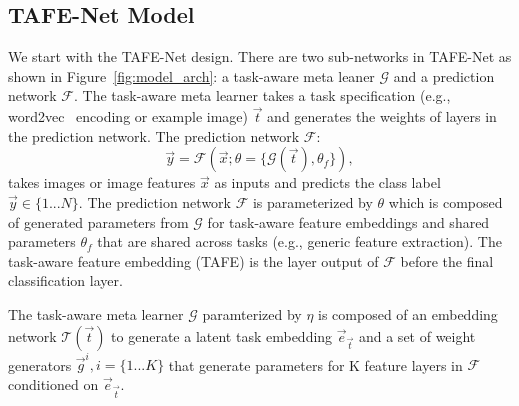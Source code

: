 \documentclass[10pt,twocolumn,letterpaper]{article}
\newcommand{\model}{TAFE-Net\xspace}
\begin{document}
\subsection{\model Model}
We start with the \model design. There are two sub-networks
in \model as shown in Figure~\ref{fig:model_arch}: a 
task-aware meta leaner $\mathcal{G}$ and a prediction network
$\mathcal{F}$. The task-aware meta learner takes a task specification (e.g., word2vec~\cite{mikolov2013efficient} encoding or example image) $\Vec{t}$ and generates the weights of layers in the prediction network. 
The prediction network $\mathcal{F}$: 
\begin{equation}
    \Vec{y} = \mathcal{F}(\Vec{x}; \theta=\{\mathcal{G}(\Vec{t}), \theta_f\}),
\end{equation}
takes images or image features  $\Vec{x}$ as inputs and predicts the class label $\Vec{y}\in\{1...N\}$.
The prediction network $\mathcal{F}$ is parameterized by $\theta$ which is composed
of generated parameters from $\mathcal{G}$ for task-aware feature embeddings 
and shared parameters  $\theta_f$ that are shared across tasks (e.g., generic feature extraction). 
The task-aware feature embedding (TAFE) is the layer output
of $\mathcal{F}$ before the final classification layer. 

The task-aware meta learner $\mathcal{G}$ paramterized by $\eta$ is composed of an embedding network 
$\mathcal{T}(\Vec{t})$ to generate a latent task embedding $\Vec{e}_\Vec{t}$ and a set of
weight generators $\Vec{g}^i, i=\{1...K\}$ that generate parameters for K feature
layers in $\mathcal{F}$ conditioned on $\Vec{e}_\Vec{t}$. 
\end{document}
